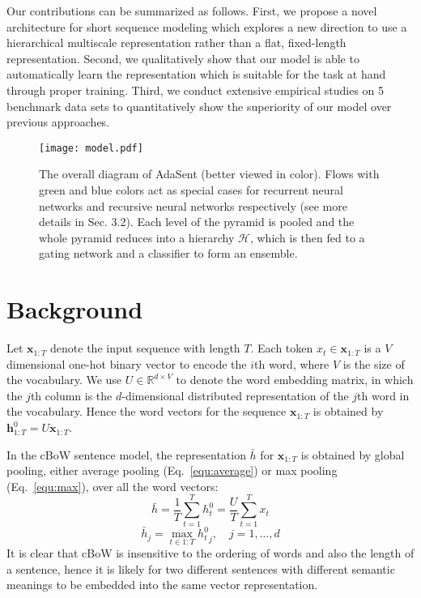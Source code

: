 \documentclass{article}
\newcommand{\RR}{\mathbb{R}}
\theoremstyle{definition}
\begin{document}
Our contributions can be summarized as follows. First, we propose a novel architecture for short sequence modeling which explores a new direction to use a hierarchical multiscale representation rather than a flat, fixed-length representation. Second, we qualitatively show that our model is able to automatically learn the representation which is suitable for the task at hand through proper training. Third, we conduct extensive empirical studies on 5 benchmark data sets to quantitatively show the superiority of our model over previous approaches.

\begin{figure}[htb]
\centering
	\texttt{[image: model.pdf]}
\caption{The overall diagram of AdaSent (better viewed in color).  Flows with green and blue colors act as special cases for recurrent neural networks and recursive neural networks respectively (see more details in Sec. 3.2). Each level of the pyramid is pooled and the whole pyramid reduces into a hierarchy $\mathcal{H}$, which is then fed to a gating network and a classifier to form an ensemble.}
\label{fig:model}
\end{figure}

\section{Background}
\label{sec:background}
Let $\mathbf{x}_{1:T}$ denote the input sequence with length $T$. Each token $x_t \in \mathbf{x}_{1:T}$ is a $V$ dimensional one-hot binary vector to encode the $i$th word, where $V$ is the size of the vocabulary. We use $U\in\RR^{d\times V}$ to denote the word embedding matrix, in which the $j$th column is the $d$-dimensional distributed representation of the $j$th word in the vocabulary. Hence the word vectors for the sequence $\mathbf{x}_{1:T}$ is obtained by $\mathbf{h}^0_{1:T} = U\mathbf{x}_{1:T}$.

In the cBoW sentence model, the representation $\bar{h}$ for $\mathbf{x}_{1:T}$ is obtained by global pooling, either average pooling (Eq.~\ref{equ:average}) or max pooling (Eq.~\ref{equ:max}), over all the word vectors:
\begin{equation}
\label{equ:average}
\bar{h} = \frac{1}{T}\sum_{t=1}^T h_t^0 = \frac{U}{T}\sum_{t=1}^T x_t
\end{equation}
\begin{equation}
\label{equ:max}
\bar{h}_j = \max_{t\in 1:T}{h_t^0}_j, \quad j=1,\ldots,d
\end{equation}
It is clear that cBoW is insensitive to the ordering of words and also the length of a sentence, hence it is likely for two different sentences with different semantic meanings to be embedded into the same vector representation.
\end{document}
